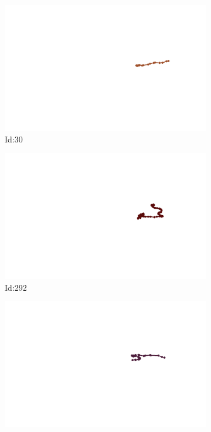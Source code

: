 \documentclass[12pt,twoside]{report}
\begin{document}
\begin{figure}
\centering
\begin{subfigure}[b]{0.20\textwidth}
\centering
\includegraphics[width=\textwidth]{../../trajectories/30.png}
\caption{Id:30}
\end{subfigure}
\begin{subfigure}[b]{0.20\textwidth}
\centering
\includegraphics[width=\textwidth]{../../trajectories/292.png}
\caption{Id:292}
\end{subfigure}
\begin{subfigure}[b]{0.20\textwidth}
\centering
\includegraphics[width=\textwidth]{../../trajectories/456.png}

\end{subfigure}
\end{figure}
\end{document}
